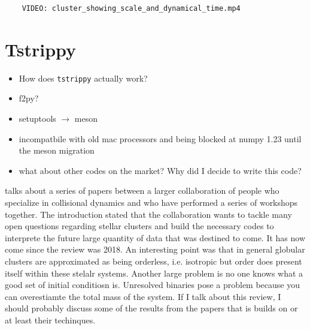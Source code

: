     \begin{verbatim}
    VIDEO: cluster_showing_scale_and_dynamical_time.mp4
    \end{verbatim}

\section{Tstrippy}

    \begin{itemize}
        \item How does \texttt{tstrippy} actually work?
        \item f2py? 
        \item setuptools $\rightarrow$ meson 
        \item incompatbile with old mac processors and being blocked at numpy 1.23 until the meson migration 
        \item what about other codes on the market? Why did I decide to write this code? 
    \end{itemize}

    \citet{2018ComAC...5....2V} talks about a series of papers between a larger collaboration of people who specialize in collisional dynamics and who have performed a series of workshops together. The introduction stated that the collaboration wants to tackle many open questions regarding stellar clusters and build the necessary codes to interprete the future large quantity of data that was destined to come. It has now come since the review was 2018. An interesting point was that in general globular clusters are approximated as being orderless, i.e. isotropic but order does present itself within these stelalr systems. Another large problem is no one knows what a good set of initial conditiosn is. Unresolved binaries pose a problem because you can overestiamte the total mass of the system. If I talk about this review, I should probably discuss some of the results from the papers that is builds on or at least their techinques.

